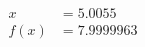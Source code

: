 \documentclass[preview]{standalone}
\begin{document}
\begin{align*}
x &= 5.0055\\f(x) &= 7.9999963
\end{align*}
\end{document}
